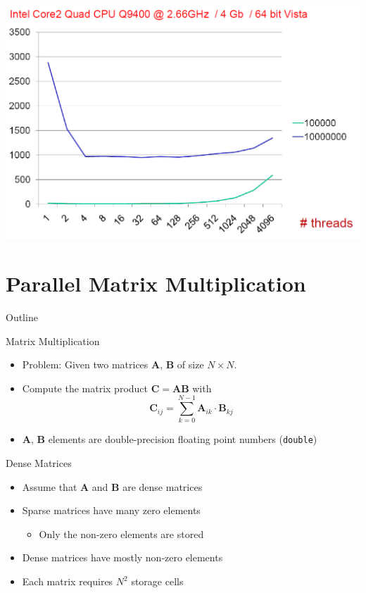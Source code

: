 \begin{frame}
  \includegraphics[width=\textwidth]{figures/measurement-3}
\end{frame}


\section{Parallel Matrix Multiplication}

\begin{frame}{Outline}
  \tableofcontents[current]
\end{frame}

\begin{frame}{Matrix Multiplication}
  \begin{itemize}
  \item Problem: Given two matrices $\mathbf{A}$, $\mathbf{B}$ of size $N \times N$.
  \item Compute the matrix product $\mathbf{C} = \mathbf{AB}$ with
    $$
    \mathbf{C}_{ij} = \sum_{k=0}^{N-1} \mathbf{A}_{ik} \cdot
    \mathbf{B}_{kj}
    $$
  \item $\mathbf{A}$, $\mathbf{B}$ elements are double-precision
    floating point numbers (\lstinline!double!)
  \end{itemize}
\end{frame}

\begin{frame}{Dense Matrices}
  \begin{itemize}
  \item Assume that $\mathbf{A}$ and $\mathbf{B}$ are dense matrices
  \item Sparse matrices have many zero elements
    \begin{itemize}
    \item Only the non-zero elements are stored
    \end{itemize}
  \item Dense matrices have mostly non-zero elements
  \item Each matrix requires $N^2$ storage cells
  \end{itemize}
\end{frame}

